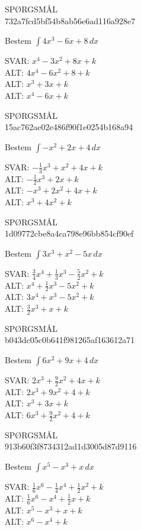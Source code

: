 \documentclass[]{article}
\newcounter{spgcounter}
\newenvironment{question}[2]{\addtocounter{spgcounter}{1} SPØRGSMÅL \thespgcounter\\}{\hspace{50px}}
\newcommand{\answer}[1]{{\color{green} SVAR: #1}\\}
\newcommand{\alt}[1]{{\color{red} ALT: #1}\\}
\begin{document}
\begin{question}{multi}\id{732a7fcd5bf54b8ab56e6ad116a928e7}

Bestem $\int{4x^3 - 6x + 8}\, dx$

\answer{$x^4 - 3x^2 + 8x + k$}
\alt{$4x^4 - 6x^2 + 8 + k$}
\alt{$x^3 + 3x + k$}
\alt{$x^4 - 6x + k$}

\end{question}

\begin{question}{multi}\id{15ac762ae02e486f90f1e0254b168a94}

Bestem $\int{-x^2 + 2x + 4}\, dx$

\answer{$-\frac{1}{3}x^3 + x^2 + 4x + k$}
\alt{$-\frac{1}{2}x^3 + 2x + k$}
\alt{$-x^3 + 2x^2 + 4x + k$}
\alt{$x^3 + 4x^2 + k$}

\end{question}

\begin{question}{multi}\id{1d09772cbe8a4ca798e96bb854cf90ef}

Bestem $\int{3x^3 + x^2 - 5x}\, dx$

\answer{$\frac{3}{4}x^4 + \frac{1}{3}x^3 - \frac{5}{2}x^2 + k$}
\alt{$x^4 + \frac{1}{2}x^3 - 5x^2 + k$}
\alt{$3x^4 + x^3 - 5x^2 + k$}
\alt{$\frac{3}{2}x^3 + x + k$}

\end{question}

\begin{question}{multi}\id{b043dc05c0b641f981265af163612a71}

Bestem $\int{6x^2 + 9x + 4}\, dx$

\answer{$2x^3 + \frac{9}{2}x^2 + 4x + k$}
\alt{$2x^3 + 9x^2 + 4 + k$}
\alt{$x^3 + 3x + k$}
\alt{$6x^3 + \frac{9}{2}x^2 + 4 + k$}

\end{question}

\begin{question}{multi}\id{913b60f3f8734312ad1d3005d87d9116}

Bestem $\int{x^5 - x^3 + x}\, dx$

\answer{$\frac{1}{6}x^6 - \frac{1}{4}x^4 + \frac{1}{2}x^2 + k$}
\alt{$\frac{1}{6}x^6 - x^4 + \frac{1}{2}x + k$}
\alt{$x^5 - x^3 + x + k$}
\alt{$x^6 - x^4 + k$}

\end{question}
\end{document}
